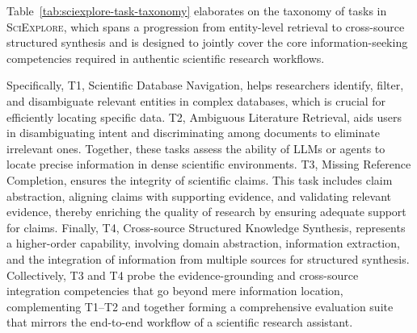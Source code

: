 

Table~\ref{tab:sciexplore-task-taxonomy} elaborates on the taxonomy of tasks in \textsc{SciExplore}, which spans a progression from entity-level retrieval to cross-source structured synthesis and is designed to jointly cover the core information-seeking competencies required in authentic scientific research workflows. 

Specifically, T1, Scientific Database Navigation, helps researchers identify, filter, and disambiguate relevant entities in complex databases, which is crucial for efficiently locating specific data. T2, Ambiguous Literature Retrieval, aids users in disambiguating intent and discriminating among documents to eliminate irrelevant ones. Together, these tasks assess the ability of LLMs or agents to locate precise information in dense scientific environments.
T3, Missing Reference Completion, ensures the integrity of scientific claims. This task includes claim abstraction, aligning claims with supporting evidence, and validating relevant evidence, thereby enriching the quality of research by ensuring adequate support for claims. Finally, T4, Cross-source Structured Knowledge Synthesis, represents a higher-order capability, involving domain abstraction, information extraction, and the integration of information from multiple sources for structured synthesis. Collectively, T3 and T4 probe the evidence-grounding and cross-source integration competencies that go beyond mere information location, complementing T1--T2 and together forming a comprehensive evaluation suite that mirrors the end-to-end workflow of a scientific research assistant.




